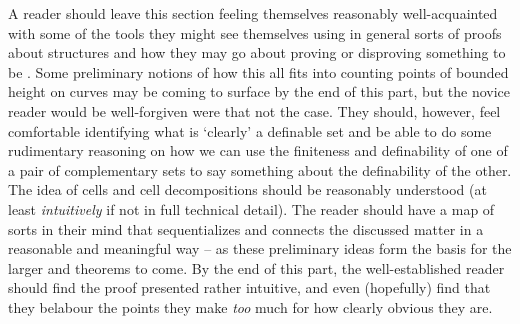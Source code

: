 \begin{partbacktext}
A reader should leave this section feeling themselves reasonably well-acquainted with some of the tools they might see themselves using in general sorts of proofs about \om structures and how they may go about proving or disproving something to be \om. Some preliminary notions of how this all fits into counting points of bounded height on curves may be coming to surface by the end of this part, but the novice reader would be well-forgiven were that not the case. They should, however, feel comfortable identifying what is `clearly' a definable set and be able to do some rudimentary reasoning on how we can use the finiteness and definability of one of a pair of complementary sets to say something about the definability of the other. The idea of cells and cell decompositions should be reasonably understood (at least \emph{intuitively} if not in full technical detail). The reader should have a map of sorts in their mind that sequentializes and connects the discussed matter in a reasonable and meaningful way -- as these preliminary ideas form the basis for the larger \lemmas and theorems to come. By the end of this part, the well-established reader should find the proof presented rather intuitive, and even (hopefully) find that they belabour the points they make \emph{too} much for how clearly obvious they are.

\end{partbacktext}
